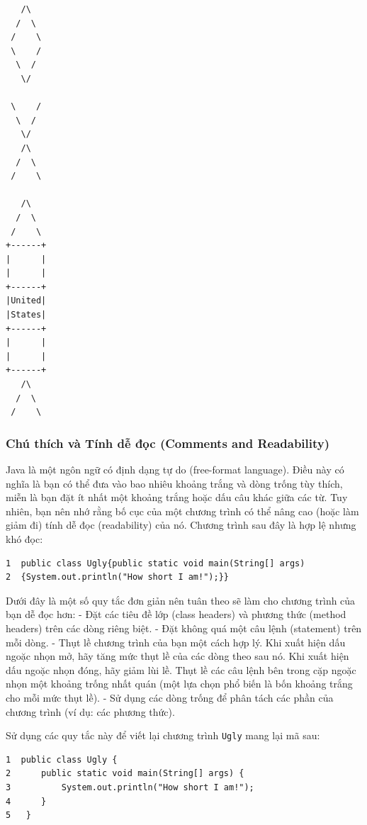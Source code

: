 \begin{verbatim}
   /\ 
  /  \ 
 /    \ 
 \    / 
  \  / 
   \/ 

 \    / 
  \  / 
   \/ 
   /\ 
  /  \ 
 /    \ 

   /\ 
  /  \ 
 /    \ 
+------+ 
|      | 
|      | 
+------+ 
|United| 
|States| 
+------+ 
|      | 
|      | 
+------+ 
   /\ 
  /  \ 
 /    \
\end{verbatim}

\subsubsection{Chú thích và Tính dễ đọc (Comments and
Readability)}\label{chuxfa-thuxedch-vuxe0-tuxednh-dux1ec5-ux111ux1ecdc-comments-and-readability}

Java là một ngôn ngữ có định dạng tự do (free-format language). Điều này
có nghĩa là bạn có thể đưa vào bao nhiêu khoảng trắng và dòng trống tùy
thích, miễn là bạn đặt ít nhất một khoảng trắng hoặc dấu câu khác giữa
các từ. Tuy nhiên, bạn nên nhớ rằng bố cục của một chương trình có thể
nâng cao (hoặc làm giảm đi) tính dễ đọc (readability) của nó. Chương
trình sau đây là hợp lệ nhưng khó đọc:

\begin{verbatim}
1  public class Ugly{public static void main(String[] args)
2  {System.out.println("How short I am!");}}
\end{verbatim}

Dưới đây là một số quy tắc đơn giản nên tuân theo sẽ làm cho chương
trình của bạn dễ đọc hơn: - Đặt các tiêu đề lớp (class headers) và
phương thức (method headers) trên các dòng riêng biệt. - Đặt không quá
một câu lệnh (statement) trên mỗi dòng. - Thụt lề chương trình của bạn
một cách hợp lý. Khi xuất hiện dấu ngoặc nhọn mở, hãy tăng mức thụt lề
của các dòng theo sau nó. Khi xuất hiện dấu ngoặc nhọn đóng, hãy giảm
lùi lề. Thụt lề các câu lệnh bên trong cặp ngoặc nhọn một khoảng trống
nhất quán (một lựa chọn phổ biến là bốn khoảng trắng cho mỗi mức thụt
lề). - Sử dụng các dòng trống để phân tách các phần của chương trình (ví
dụ: các phương thức).

Sử dụng các quy tắc này để viết lại chương trình \texttt{Ugly} mang lại
mã sau:

\begin{verbatim}
1  public class Ugly {
2      public static void main(String[] args) {
3          System.out.println("How short I am!");
4      }
5   }
\end{verbatim}

